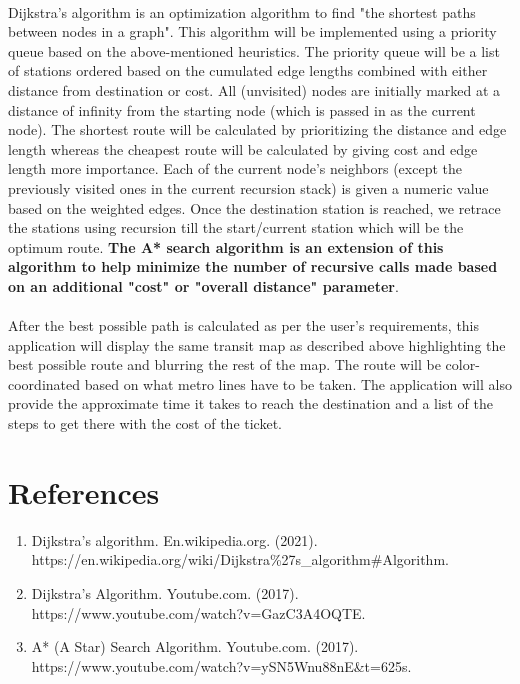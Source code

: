 \documentclass[fontsize=11pt]{article}
\begin{document}
\\
Dijkstra's algorithm is an optimization algorithm to find "the shortest paths between nodes in a graph". This algorithm will be implemented using a priority queue based on the above-mentioned heuristics. The priority queue will be a list of stations ordered based on the cumulated edge lengths combined with either distance from destination or cost. All (unvisited) nodes are initially marked at a distance of infinity from the starting node (which is passed in as the current node). The shortest route will be calculated by prioritizing the distance and edge length whereas the cheapest route will be calculated by giving cost and edge length more importance. Each of the current node's neighbors (except the previously visited ones in the current recursion stack) is given a numeric value based on the weighted edges. Once the destination station is reached, we retrace the stations using recursion till the start/current station which will be the optimum route. \textbf{The A* search algorithm is an extension of this algorithm to help minimize the number of recursive calls made based on an additional "cost" or "overall distance" parameter}.\\
\\
After the best possible path is calculated as per the user's requirements, this application will display the same transit map as described above highlighting the best possible route and blurring the rest of the map. The route will be color-coordinated based on what metro lines have to be taken. The application will also provide the approximate time it takes to reach the destination and a list of the steps to get there with the cost of the ticket.
\section*{References}
\begin{enumerate}
    \item Dijkstra's algorithm. En.wikipedia.org. (2021). https://en.wikipedia.org/wiki/Dijkstra\%27s\_algorithm\#Algorithm.
    \item Dijkstra's Algorithm. Youtube.com. (2017). https://www.youtube.com/watch?v=GazC3A4OQTE.
    \item A* (A Star) Search Algorithm. Youtube.com. (2017). https://www.youtube.com/watch?v=ySN5Wnu88nE\&t=625s.
\end{enumerate}


\end{document}
